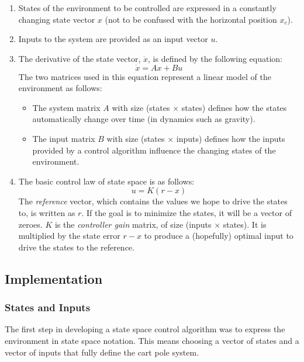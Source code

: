 \documentclass[12pt]{article}
\begin{document}
\begin{enumerate}
    \item States of the environment to be controlled are expressed in a constantly changing state vector $x$ (not to be confused with the horizontal position $x _c$).
    \item Inputs to the system are provided as an input vector $u$.
    \item The derivative of the state vector, $\dot x$, is defined by the following equation:
        \begin{equation}
            \dot x = A x + B u
        \end{equation}
        The two matrices used in this equation represent a linear model of the environment as follows:
        \begin{itemize}
            \item The system matrix $A$ with size (states $\times$ states) defines how the states automatically change over time (in dynamics such as gravity).
            \item The input matrix $B$ with size (states $\times$ inputs) defines how the inputs provided by a control algorithm influence the changing states of the environment.
        \end{itemize}
    \item The basic control law of state space is as follows:
        \begin{equation} \label{control_law}
            u = K(r - x)
        \end{equation}
        The \textit{reference} vector, which contains the values we hope to drive the states to, is written as $r$. If the goal is to minimize the states, it will be a vector of zeroes. $K$ is the \textit{controller gain} matrix, of size (inputs $\times$ states). It is multiplied by the state error $r - x$ to produce a (hopefully) optimal input to drive the states to the reference.
\end{enumerate}

\subsection{Implementation}

\subsubsection{States and Inputs}

The first step in developing a state space control algorithm was to express the environment in state space notation. This means choosing a vector of states and a vector of inputs that fully define the cart pole system.
\end{document}
